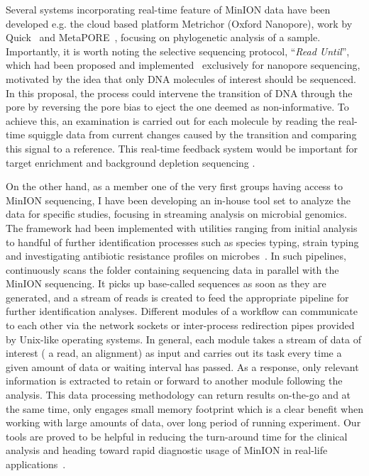 Several systems incorporating real-time feature of MinION data have been developed e.g. the cloud based platform Metrichor (Oxford Nanopore), work by Quick\etal{}~\cite{QuickAC2015} and MetaPORE~\cite{GreningerNF2015}, focusing on phylogenetic analysis of a sample. 
Importantly, it is worth noting the selective sequencing protocol, \IE{}``\emph{Read Until}'', which had been proposed and implemented~\cite{LooseMS2016} exclusively for nanopore sequencing, motivated by the idea that only DNA molecules of interest should be sequenced. In this proposal, the process could intervene the transition of DNA through the pore by reversing the pore bias to eject the one deemed as non-informative. To achieve this, an examination is carried out for each molecule by reading the real-time squiggle data from current changes caused by the transition and comparing this signal to a reference. This real-time feedback system would be important for target enrichment and background depletion sequencing \cite{Edwards2018real}. 

On the other hand, as a member one of the very first groups having access to MinION sequencing, I have been developing an in-house tool set to analyze the data for specific studies, focusing in streaming analysis on microbial genomics.  
The framework had been implemented with utilities ranging from initial analysis to handful of further identification processes such as species typing, strain typing and investigating antibiotic resistance profiles on microbes~\cite{CaoGE2016}. In such pipelines, \npreader{}~\cite{CaoGC2016} continuously scans the folder containing sequencing data in parallel with the MinION sequencing. It picks up base-called sequences as soon as they are generated, and a stream of reads is created to feed the  appropriate pipeline for further identification analyses. 
Different modules of a workflow can communicate to each other via the network sockets or inter-process redirection pipes provided by Unix-like operating systems.
In general, each module takes a stream of data of interest (\EG{} a read, an alignment) as input and carries out its task every time a given amount of data or waiting interval has passed. As a response, only relevant information is extracted to retain or forward to another module following the analysis. 
This data processing methodology can return results on-the-go and at the same time, only engages small memory footprint which is a clear benefit when working with large amounts of data, over long period of running experiment.  
Our tools are proved to be helpful in reducing the turn-around time for the clinical analysis and heading toward rapid diagnostic usage of MinION in real-life applications~\cite{Bialasiewicz2018rapid}.

